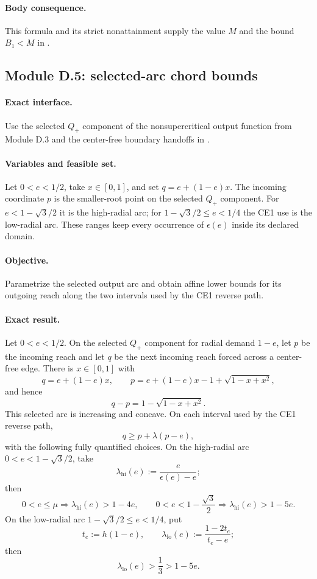 \paragraph{Body consequence.}
This formula and its strict nonattainment supply the value $M$ and the bound
$B_1<M$ in .

\subsection{Module D.5: selected-arc chord bounds}

\paragraph{Exact interface.}
Use the selected $Q_+$ component of the nonsupercritical output function from
Module D.3 and the center-free boundary handoffs in
.

\paragraph{Variables and feasible set.}
Let $0<e<1/2$, take $x\in[0,1]$, and set
$q=e+(1-e)x$.  The incoming coordinate $p$ is the smaller-root point on the
selected $Q_+$ component.  For $e<1-\sqrt3/2$ it is the high-radial arc; for
$1-\sqrt3/2\le e<1/4$ the CE1 use is the low-radial arc.  These ranges keep
every occurrence of $\epsilon(e)$ inside its declared domain.

\paragraph{Objective.}
Parametrize the selected output arc and obtain affine lower bounds for its
outgoing reach along the two intervals used by the CE1 reverse path.

\paragraph{Exact result.}

\begin{lemma}
\label{lem:app-selected-chords}
Let $0<e<1/2$.  On the selected $Q_+$ component for radial demand $1-e$,
let $p$ be the incoming reach and let $q$ be the next incoming reach forced
across a center-free edge.  There is $x\in[0,1]$ with
\[
 q=e+(1-e)x,
 \qquad
 p=e+(1-e)x-1+\sqrt{1-x+x^2},
\]
and hence
\[
 q-p=1-\sqrt{1-x+x^2}.
\]
This selected arc is increasing and concave.  On each interval used by the
CE1 reverse path,
\[
 q\ge p+\lambda(p-e),
\]
with the following fully quantified choices.  On the high-radial arc
$0<e<1-\sqrt3/2$, take
\[
 \lambda_{\mathrm{hi}}(e):=\frac{e}{\epsilon(e)-e};
\]
then
\[
 0<e\le\mu\Longrightarrow\lambda_{\mathrm{hi}}(e)>1-4e,
 \qquad
 0<e<1-\frac{\sqrt3}{2}
 \Longrightarrow\lambda_{\mathrm{hi}}(e)>1-5e.
\]
On the low-radial arc $1-\sqrt3/2\le e<1/4$, put
\[
 t_e:=h(1-e),
 \qquad
 \lambda_{\mathrm{lo}}(e):=\frac{1-2t_e}{t_e-e};
\]
then
\[
 \lambda_{\mathrm{lo}}(e)>\frac13>1-5e.
\]
\end{lemma}

